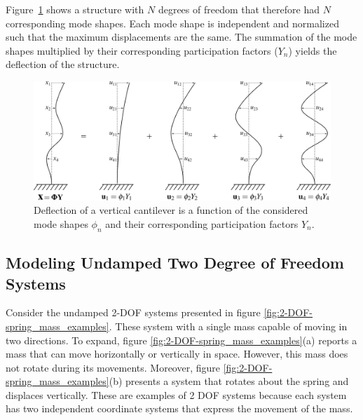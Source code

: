 \documentclass[12pt,letter]{article}
\numberwithin{ex}{section} %
\numberwithin{re}{section} %
\newcommand{\rd}[1]{\textcolor[rgb]{0.75,0.00,0.00}{#1}}
\begin{document}
Figure~\ref{fig:general_mode_shapes} shows a structure with $N$ degrees of freedom that therefore had $N$ corresponding mode shapes. Each mode shape is independent and normalized such that the maximum displacements are the same. The summation of the mode shapes multiplied by their corresponding participation factors ($Y_n$) yields the deflection of the structure. 


\begin{figure}[H]
	\centering
	\includegraphics[]{../Figures/general_mode_shapes.png}
	\caption{Deflection of a vertical cantilever is a function of the considered mode shapes $\phi_n$ and their corresponding \rd{participation factors $Y_n$.} }
	\label{fig:general_mode_shapes}
\end{figure}

\subsection{Modeling Undamped Two Degree of Freedom Systems}
\label{sec:two_degree_of_freedom}

Consider the undamped 2-DOF systems presented in figure \ref{fig:2-DOF-spring_mass_examples}. These system with a single mass capable of moving in two directions. To expand, figure \ref{fig:2-DOF-spring_mass_examples}(a) reports a mass that can move horizontally or vertically in space. However, this mass does not rotate during its movements. Moreover, figure \ref{fig:2-DOF-spring_mass_examples}(b) presents a system that rotates about the spring and displaces vertically. These are examples of 2 DOF systems because each system has two independent coordinate systems that express the movement of the mass. 
\end{document}
